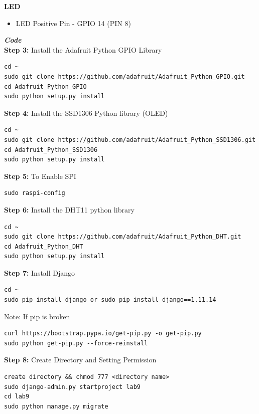 \documentclass[12pt,a4paper]{article}
\begin{document}
\begin{flushleft}
\textbf{LED}
\begin{itemize}
    \item LED Positive Pin - GPIO 14 (PIN 8) 
\end{itemize}

\textbf{\textit{Code}}\\

\textbf{Step 3:}
Install the Adafruit Python GPIO Library
\begin{lstlisting}
cd ~
sudo git clone https://github.com/adafruit/Adafruit_Python_GPIO.git
cd Adafruit_Python_GPIO
sudo python setup.py install
\end{lstlisting}
\vspace{5mm}
\textbf{Step 4:}
Install the SSD1306 Python library (OLED)

\begin{lstlisting}
cd ~
sudo git clone https://github.com/adafruit/Adafruit_Python_SSD1306.git
cd Adafruit_Python_SSD1306
sudo python setup.py install
\end{lstlisting}
\clearpage

\textbf{Step 5:}
To Enable SPI
\begin{lstlisting}
sudo raspi-config
\end{lstlisting}
\vspace{5mm}
\textbf{Step 6:} Install the DHT11 python library

\begin{lstlisting}
cd ~
sudo git clone https://github.com/adafruit/Adafruit_Python_DHT.git
cd Adafruit_Python_DHT
sudo python setup.py install
\end{lstlisting}
\vspace{5mm}

\textbf{Step 7:} Install Django
\begin{lstlisting}
cd ~ 
sudo pip install django or sudo pip install django==1.11.14
\end{lstlisting}
\vspace{5mm}
Note: If pip is broken
\begin{lstlisting}
curl https://bootstrap.pypa.io/get-pip.py -o get-pip.py
sudo python get-pip.py --force-reinstall
\end{lstlisting}
\vspace{5mm}

\textbf{Step 8:} Create Directory and Setting Permission
\begin{lstlisting}
create directory && chmod 777 <directory name>
sudo django-admin.py startproject lab9
cd lab9
sudo python manage.py migrate
\end{lstlisting}
\vspace{5mm}


\end{flushleft}
\end{document}
